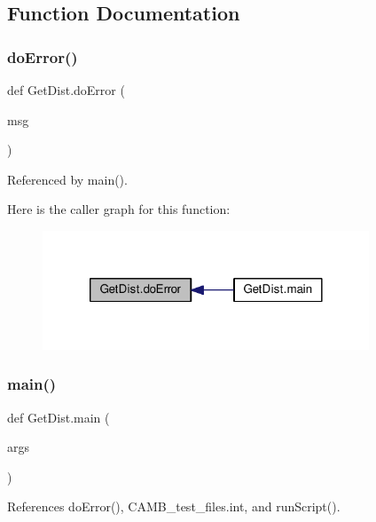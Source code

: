 \subsection{Function Documentation}
\mbox{\label{namespaceGetDist_a6c4a80c175454d167b12b13c976ef1dd}} 
\subsubsection{\texorpdfstring{do\+Error()}{doError()}}
{\footnotesize\ttfamily def Get\+Dist.\+do\+Error (\begin{DoxyParamCaption}\item[{}]{msg }\end{DoxyParamCaption})}



Referenced by main().

Here is the caller graph for this function\+:
\nopagebreak
\begin{figure}[H]
\begin{center}
\leavevmode
\includegraphics[width=276pt]{namespaceGetDist_a6c4a80c175454d167b12b13c976ef1dd_icgraph}
\end{center}
\end{figure}
\mbox{\label{namespaceGetDist_acc8ec19c3d04e93378678f5ac0f776cf}} 
\subsubsection{\texorpdfstring{main()}{main()}}
{\footnotesize\ttfamily def Get\+Dist.\+main (\begin{DoxyParamCaption}\item[{}]{args }\end{DoxyParamCaption})}



References do\+Error(), C\+A\+M\+B\+\_\+test\+\_\+files.\+int, and run\+Script().


